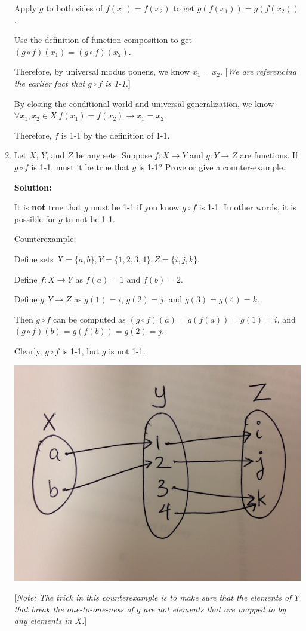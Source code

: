 \documentclass[11pt, letterpaper]{report}
\newcommand{\proofnote}[1]{[\textit{Note: #1}]}
\begin{document}
\begin{enumerate}
Apply $g$ to both sides of $f(x_1) = f(x_2)$ to get $g(f(x_1)) = g(f(x_2))$.

Use the definition of function composition to get $(g \circ f)(x_1) = (g \circ f)(x_2)$.

Therefore, by universal modus ponens, we know $x_1=x_2$.  [\textit{We are referencing the earlier fact that $g\circ f$ is 1-1.}]

By closing the conditional world and universal generalization, we know  \\
$\forall x_1, x_2 \in X \ f(x_1) = f(x_2) \to x_1 = x_2$.

Therefore, $f$ is 1-1 by the definition of 1-1.


\item Let $X$, $Y$, and $Z$ be any sets.  Suppose $f:X\to Y$ and $g: Y \to Z$ are functions.
If $g \circ f$ is 1-1, must it be true that $g$ is 1-1?  Prove or give a counter-example.

\textbf{Solution:}

It is \textbf{not} true that $g$ must be 1-1 if you know $g \circ f$ is 1-1.  In other words, it
is possible for $g$ to not be 1-1.

Counterexample:

Define sets $X=\{a,b\}, Y=\{1,2,3,4\}, Z=\{i,j,k\}$. 

 Define $f:X \to Y$ as $f(a)=1$
and $f(b) = 2$.  

Define $g:Y\to Z$ as $g(1)=i$, $g(2)=j$, and $g(3)=g(4)=k$.

Then $g \circ f$ can be computed as $(g \circ f)(a) = g(f(a)) = g(1)=i$, and 
$(g \circ f)(b) = g(f(b)) = g(2)=j$.

Clearly, $g\circ f$ is 1-1, but $g$ is not 1-1.

\includegraphics[scale=0.3]{hw10image2.jpg}

\proofnote{The trick in this counterexample is to make sure that the elements of $Y$ that
break the one-to-one-ness of $g$ are not elements that are mapped to by any elements in $X$.}


\end{enumerate}
\bigskip
\end{document}
